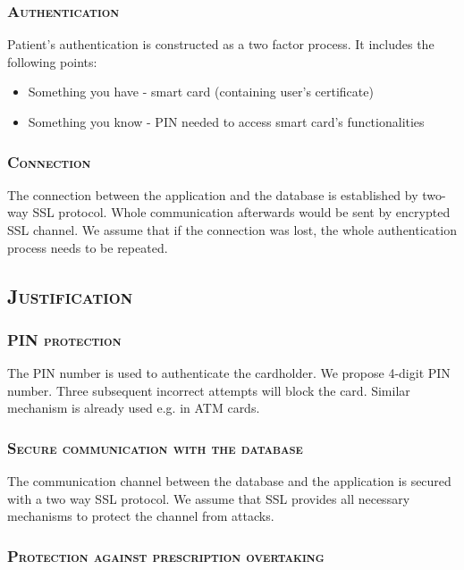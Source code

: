 \documentclass[12pt,titlepage]{article}
\begin{document}
\subsubsection{\textsc{Authentication}}

Patient's authentication is constructed as a two factor process. It includes the following points:
\begin{itemize}
\item Something you have - smart card (containing user's certificate)
\item Something you know - PIN needed to access smart card's functionalities
\end{itemize}

\subsubsection{\textsc{Connection}}

The connection between the application and the database is established by two-way SSL protocol. Whole communication afterwards would be sent by encrypted SSL channel. We assume that if the connection was lost, the whole authentication process needs to be repeated.

\subsection{\textsc{Justification}}

\subsubsection{\textsc{PIN protection}}

The PIN number is used to authenticate the cardholder. We propose 4-digit PIN number. Three subsequent incorrect attempts will block the card. Similar mechanism is already used e.g. in ATM cards.	

\subsubsection{\textsc{Secure communication with the database}}

The communication channel between the database and the application is secured with a two way SSL protocol. We assume that SSL provides all necessary mechanisms to protect the channel from attacks.

\subsubsection{\textsc{Protection against prescription overtaking}}
\end{document}
